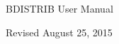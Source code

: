 \begin{center}

\vspace*{2in}

{\Huge BDISTRIB User Manual}

\vspace{4in}


\vspace{0.5in}

Revised August 25, 2015

\end{center}

